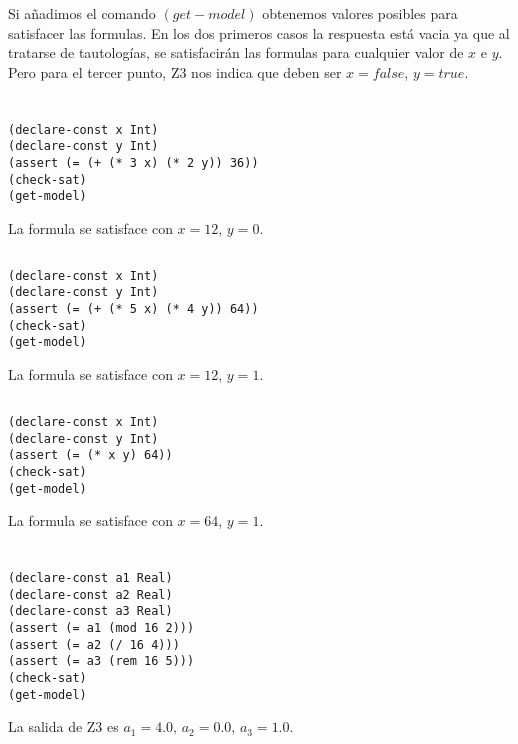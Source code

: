 Si añadimos el comando $(get-model)$ obtenemos valores posibles para satisfacer las formulas. En los dos primeros casos la respuesta está vacia ya que al tratarse de tautologías, se satisfacirán las formulas para cualquier valor de $x$ e $y$. Pero para el tercer punto, Z3 nos indica que deben ser $x = false$, $y = true$.

\section{}
\subsection{}
\begin{verbatim}
(declare-const x Int)
(declare-const y Int)
(assert (= (+ (* 3 x) (* 2 y)) 36))
(check-sat)
(get-model)
\end{verbatim}

La formula se satisface con $x = 12$, $y = 0$.

\subsection{}
\begin{verbatim}
(declare-const x Int)
(declare-const y Int)
(assert (= (+ (* 5 x) (* 4 y)) 64))
(check-sat)
(get-model)
\end{verbatim}

La formula se satisface con $x = 12$, $y = 1$.

\subsection{}
\begin{verbatim}
(declare-const x Int)
(declare-const y Int)
(assert (= (* x y) 64))
(check-sat)
(get-model)
\end{verbatim}

La formula se satisface con $x = 64$, $y = 1$.

\section{}
\begin{verbatim}
(declare-const a1 Real)
(declare-const a2 Real) 
(declare-const a3 Real)
(assert (= a1 (mod 16 2)))
(assert (= a2 (/ 16 4)))
(assert (= a3 (rem 16 5)))
(check-sat)
(get-model)
\end{verbatim}

La salida de Z3 es $a_1 = 4.0$, $a_2 = 0.0$, $a_3 = 1.0$.

